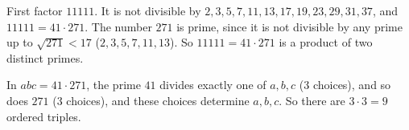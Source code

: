 First factor $11111$. It is not divisible by $2,3,5,7,11,13,17,19,23,29,31,37$, and $11111=41\cdot271$. The number $271$ is prime, since it is not divisible by any prime up to $\sqrt{271}<17$ ($2,3,5,7,11,13$). So $11111=41\cdot271$ is a product of two distinct primes.

In $abc=41\cdot271$, the prime $41$ divides exactly one of $a,b,c$ (3 choices), and so does $271$ (3 choices), and these choices determine $a,b,c$. So there are $3\cdot3=\boxed{9}$ ordered triples.
